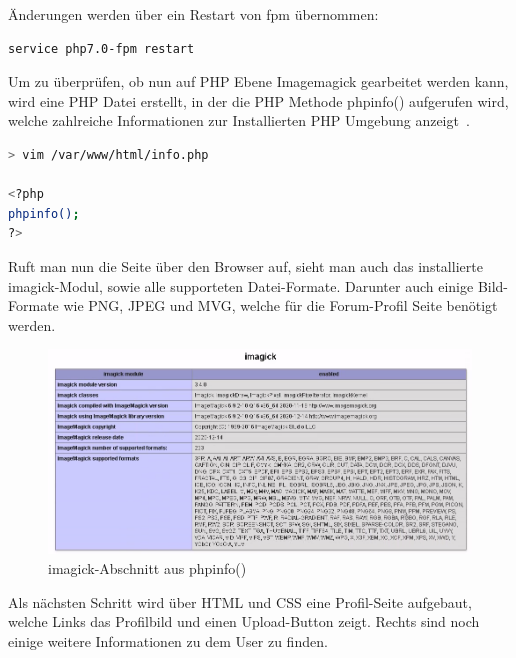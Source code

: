 Änderungen werden über ein Restart von fpm übernommen:
\begin{lstlisting}[language=Bash, caption=PHP-FPM Neustarten,label={lst:phpfpmrestart}]
service php7.0-fpm restart
\end{lstlisting}


Um zu überprüfen, ob nun auf PHP Ebene Imagemagick gearbeitet werden kann, wird eine PHP Datei erstellt, in der die PHP Methode phpinfo() aufgerufen wird, welche zahlreiche Informationen zur Installierten PHP Umgebung anzeigt~\cite{PHPPhpinfoManual}.

\begin{lstlisting}[language=Bash, caption=info.php mit phpinfo(),label={lst:phpinfo}]
> vim /var/www/html/info.php

<?php
phpinfo();
?>
\end{lstlisting}
\vspace{5mm}

Ruft man nun die Seite über den Browser auf, sieht man auch das installierte imagick-Modul, sowie alle supporteten Datei-Formate.
Darunter auch einige Bild-Formate wie PNG, JPEG und MVG, welche für die Forum-Profil Seite benötigt werden.

\begin{figure}[H]
    \includegraphics[width=1\textwidth]{img/phpinfo.png}
    \caption{imagick-Abschnitt aus phpinfo()}\label{fig:phpinfo}
\end{figure}


Als nächsten Schritt wird über HTML und CSS eine Profil-Seite aufgebaut, welche Links das Profilbild und einen Upload-Button zeigt.
Rechts sind noch einige weitere Informationen zu dem User zu finden.

